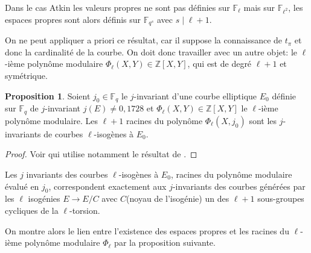 \documentclass[10pt,a4paper]{book}
\theoremstyle{plain}
\theoremstyle{definition}
\theoremstyle{definition}
\theoremstyle{definition}
\theoremstyle{definition}
\newtheorem{prop}[thm]{Proposition}
\theoremstyle{definition}
\theoremstyle{remark}
\theoremstyle{remark}
\theoremstyle{definition}
\begin{document}
	Dans le cas Atkin les valeurs propres ne sont pas définies sur $\mathbb{F}_\ell$ mais sur $\mathbb{F}_{\ell^2}$, les espaces propres sont alors définis sur $\mathbb{F}_{q^s}$ avec $s \mid \ell+1$.
	
	
	On ne peut appliquer a priori ce résultat, car il suppose la connaissance de 
$t_{\pi}$ et donc la cardinalité de la courbe. On doit donc travailler avec un 
autre objet: le $\ell$-ième polynôme modulaire $\Phi_{\ell}(X,Y) \in 
\mathbb{Z}[X,Y] $, qui est de degré $\ell+1$ et symétrique. 
 
\begin{prop}
Soient $j_0 \in \mathbb{F}_q$ le $j$-invariant d'une courbe elliptique $E_0$ définie sur $\mathbb{F}_q$ de $j$-invariant $j(E) \neq 0,1728$ et  $\Phi_{\ell}(X,Y) \in \mathbb{Z}[X,Y] $ le $\ell$-ième polynôme modulaire. Les $\ell+1$ racines du polynôme $\Phi_{\ell}(X,j_0)$ sont les $j$-invariants de courbes $\ell$-isogènes à $E_0$. 
\end{prop}

\begin{proof}
Voir \cite[Théorème 4.1.1]{Fouquet01} qui utilise notamment le résultat de 
\cite[Theorem 11.23]{Cox89}.
\end{proof}
 
Les $j$ invariants des courbes $\ell$-isogènes à $E_0$, racines du polynôme modulaire évalué en $j_0$, correspondent exactement aux $j$-invariants des  courbes générées par les $\ell$ isogénies $E \to E/C$ avec $C$(noyau de l'isogénie) un des $\ell+1$ sous-groupes cycliques de la $\ell$-torsion. 

On montre alors le lien entre l'existence des espaces propres et les racines du $\ell$-ième polynôme modulaire $\Phi_{\ell}$ par la proposition suivante. 

 
 
 
\end{document}
